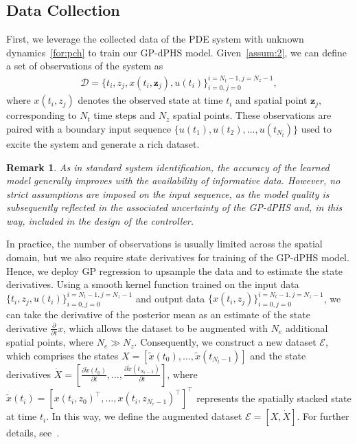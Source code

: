 \documentclass[letterpaper, 10 pt, conference]{ieeeconf}  %
\newcounter{part} %
\newtheorem{rem}{Remark}
\newcommand{\bm}[1]{{\boldsymbol{#1}}}
\newcommand{\z}{\bm z}
\begin{document}
\subsection{Data Collection}\label{subsubsec:Data}
First, we leverage the collected data of the PDE system with unknown dynamics~\cref{for:pch} to train our GP-dPHS model. Given~\cref{assum:2}, we can define a set of observations of the system as 
\begin{align}
    \mathcal{D} = \{t_i,z_j,x(t_i,\z_j),u(t_i)\}_{i=0,j=0}^{i=N_t-1,j=N_z-1}, \label{for:dataD}
\end{align}
where \( x(t_i, z_j) \) denotes the observed state at time \( t_i \) and spatial point \( \z_j \), corresponding to \( N_t \) time steps and \( N_z \) spatial points. These observations are paired with a boundary input sequence \( \{u(t_1), u(t_2), \dots,u(t_{N_t})\} \) used to excite the system and generate a rich dataset.
\begin{rem}
As in standard system identification, the accuracy of the learned model generally improves with the availability of informative data. However, no strict assumptions are imposed on the input sequence, as the model quality is subsequently reflected in the associated uncertainty of the GP-dPHS and, in this way, included in the design of the controller.
\end{rem}

In practice, the number of observations is usually limited across the spatial domain, but we also require state derivatives for training of the GP-dPHS model. Hence, we deploy GP regression to upsample the data and to estimate the state derivatives. Using a smooth kernel function trained on the input data $\{t_i,z_j,u(t_i)\}_{i=0,j=0}^{i=N_t-1,j=N_z-1}$ and output data $\{x(t_i,z_j)\}_{i=0,j=0}^{i=N_t-1,j=N_z-1}$, we can take the derivative of the posterior mean as an estimate of the state derivative \(\frac{\partial}{\partial t} x\), which allows the dataset to be augmented with \( N_e \) additional spatial points, where \( N_e \gg N_z \). Consequently, we construct a new dataset \(\mathcal{E}\), which comprises the states \( X = [\tilde{x}(t_0), \ldots, \tilde{x}(t_{N_t-1})] \) and the state derivatives \( \dot{X} = \left[\frac{\partial \tilde{x}(t_0)}{\partial t}, \ldots, \frac{\partial \tilde{x}(t_{N_t-1})}{\partial t} \right] \), where \(\tilde{x}(t_i) = [x(t_i, z_0)^\top, \ldots, x(t_i, z_{N_e-1})^\top]^\top\) represents the spatially stacked state at time \( t_i \). In this way, we define the augmented dataset \(\mathcal{E} = [X, \dot{X}]\). For further details, see~\cite{tan2024physics}.
\end{document}
